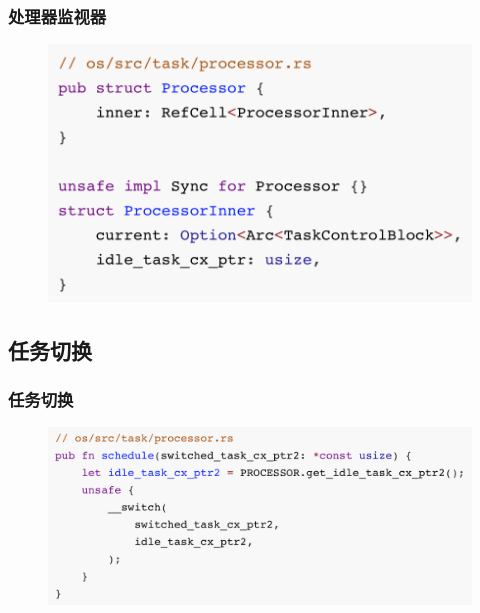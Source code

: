 \begin{frame}[fragile]
    \frametitle{处理器监视器}
% 
	\begin{figure}
		\centering
		\includegraphics[width=0.7\linewidth]{figs/processor.png}
	\end{figure}



% 
% 
\end{frame}
\subsection{任务切换}
\begin{frame}[fragile]
    \frametitle{任务切换} 
	\begin{figure}
		\centering
		\includegraphics[width=0.7\linewidth]{figs/scheduler.png}
	\end{figure}




\end{frame}

